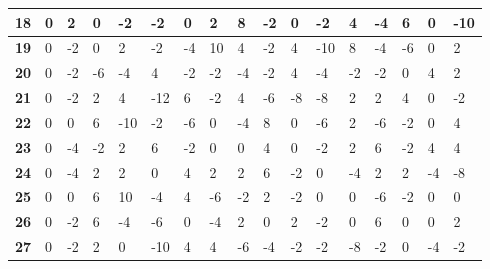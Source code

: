\begin{longtable}[c]{|l|l|l|l|l|l|l|l|l|l|l|l|l|l|l|l|l|}
\textbf{18} & 0          & 2          & 0          & -2         & -2         & 0          & 2          & 8          & -2         & 0          & -2          & 4           & -4          & 6           & 0           & -10         \\ \hline
\textbf{19} & 0          & -2         & 0          & 2          & -2         & -4         & 10         & 4          & -2         & 4          & -10         & 8           & -4          & -6          & 0           & 2           \\ \hline
\textbf{20} & 0          & -2         & -6         & -4         & 4          & -2         & -2         & -4         & -2         & 4          & -4          & -2          & -2          & 0           & 4           & 2           \\ \hline
\textbf{21} & 0          & -2         & 2          & 4          & -12        & 6          & -2         & 4          & -6         & -8         & -8          & 2           & 2           & 4           & 0           & -2          \\ \hline
\textbf{22} & 0          & 0          & 6          & -10        & -2         & -6         & 0          & -4         & 8          & 0          & -6          & 2           & -6          & -2          & 0           & 4           \\ \hline
\textbf{23} & 0          & -4         & -2         & 2          & 6          & -2         & 0          & 0          & 4          & 0          & -2          & 2           & 6           & -2          & 4           & 4           \\ \hline
\textbf{24} & 0          & -4         & 2          & 2          & 0          & 4          & 2          & 2          & 6          & -2         & 0           & -4          & 2           & 2           & -4          & -8          \\ \hline
\textbf{25} & 0          & 0          & 6          & 10         & -4         & 4          & -6         & -2         & 2          & -2         & 0           & 0           & -6          & -2          & 0           & 0           \\ \hline
\textbf{26} & 0          & -2         & 6          & -4         & -6         & 0          & -4         & 2          & 0          & 2          & -2          & 0           & 6           & 0           & 0           & 2           \\ \hline
\textbf{27} & 0          & -2         & 2          & 0          & -10        & 4          & 4          & -6         & -4         & -2         & -2          & -8          & -2          & 0           & -4          & -2          \\ \hline

\end{longtable}
